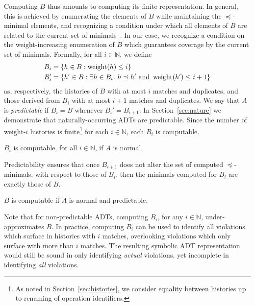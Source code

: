 Computing $B$ thus amounts to computing its finite representation. In general,
this is achieved by enumerating the elements of $B$ while maintaining the
$\preceq$-minimal elements, and recognizing a condition under which all
elements of $B$ are related to the current set of
minimals~\cite{conf/lics/AbdullaCJT96, journals/tcs/FinkelS01}. In our case, we
recognize a condition on the weight-increasing enumeration of $B$ which
guarantees coverage by the current set of minimals. Formally, for all $i \in
\mathbb{N}$, we define
\begin{align*}
  B_i &= {\{{ h \in B : \operatorname{weight}(h) \le i }\}} \\
  B_i' &= {\{{ h' \in B :
    \exists h \in B_i.\ h \preceq h' \text{ and } \operatorname{weight}(h') \le i+1
  }\}}
\end{align*}
as, respectively, the histories of $B$ with at most $i$ matches and duplicates,
and those derived from $B_i$ with at most $i\!+\!1$ matches and duplicates. We
say that $A$ is \emph{predictable} if $B_i = B$ whenever $B_i' = B_{i+1}$. In
Section~\ref{sec:nature} we demonstrate that naturally-occurring ADTs are
predictable. Since the number of weight-$i$ histories is finite\footnote{As
noted in Section~\ref{sec:histories}, we consider equality between histories up
to renaming of operation identifiers.} for each $i \in \mathbb{N}$, each $B_i$
is computable.

\begin{lemma}

  $B_i$ is computable, for all $i \in \mathbb{N}$, if $A$ is normal.

\end{lemma}

Predictability ensures that once $B_{i+1}$ does not alter the set of computed
$\preceq$-minimals, with respect to those of $B_i$, then the minimals computed
for $B_i$ are exactly those of $B$.

\begin{lemma}

  $B$ is computable if $A$ is normal and predictable.

\end{lemma}

Note that for non-predictable ADTs, computing $B_i$, for any $i \in
\mathbb{N}$, under-approximates $B$. In practice, computing $B_i$ can be used
to identify all violations which surface in histories with $i$ matches,
overlooking violations which only surface with more than $i$ matches. The
resulting symbolic ADT representation would still be sound in only identifying
\emph{actual} violations, yet incomplete in identifying \emph{all} violations.

